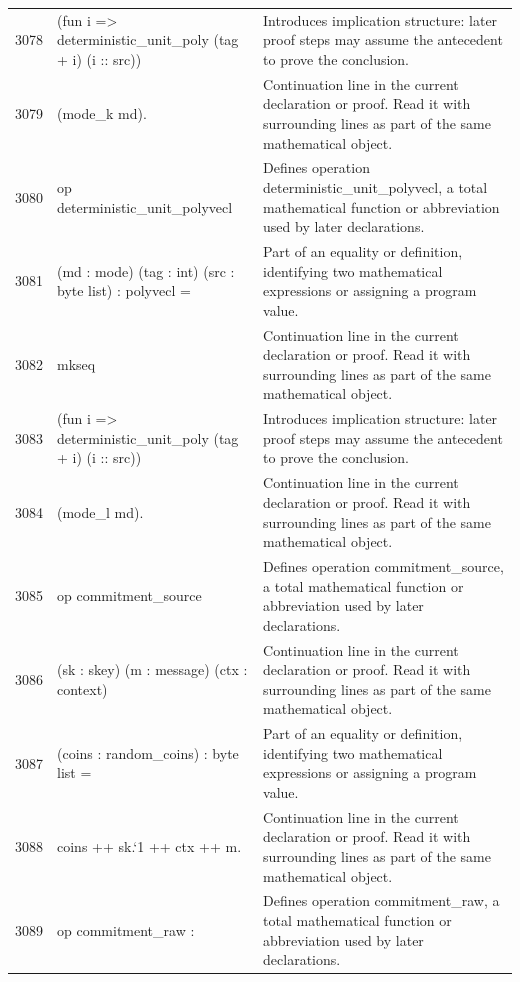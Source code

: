 \documentclass[10pt]{article}
\begin{document}
\begin{longtable}{r L{0.53\textwidth} L{0.37\textwidth}}
3078 & {\ttfamily\scriptsize     (fun i => deterministic\_unit\_poly (tag + i) (i :: src))} & Introduces implication structure: later proof steps may assume the antecedent to prove the conclusion. \\
3079 & {\ttfamily\scriptsize     (mode\_k md).} & Continuation line in the current declaration or proof.  Read it with surrounding lines as part of the same mathematical object. \\
3080 & {\ttfamily\scriptsize op deterministic\_unit\_polyvecl} & Defines operation deterministic\_unit\_polyvecl, a total mathematical function or abbreviation used by later declarations. \\
3081 & {\ttfamily\scriptsize    (md : mode) (tag : int) (src : byte list) : polyvecl =} & Part of an equality or definition, identifying two mathematical expressions or assigning a program value. \\
3082 & {\ttfamily\scriptsize   mkseq} & Continuation line in the current declaration or proof.  Read it with surrounding lines as part of the same mathematical object. \\
3083 & {\ttfamily\scriptsize     (fun i => deterministic\_unit\_poly (tag + i) (i :: src))} & Introduces implication structure: later proof steps may assume the antecedent to prove the conclusion. \\
3084 & {\ttfamily\scriptsize     (mode\_l md).} & Continuation line in the current declaration or proof.  Read it with surrounding lines as part of the same mathematical object. \\
3085 & {\ttfamily\scriptsize op commitment\_source} & Defines operation commitment\_source, a total mathematical function or abbreviation used by later declarations. \\
3086 & {\ttfamily\scriptsize    (sk : skey) (m : message) (ctx : context)} & Continuation line in the current declaration or proof.  Read it with surrounding lines as part of the same mathematical object. \\
3087 & {\ttfamily\scriptsize    (coins : random\_coins) : byte list =} & Part of an equality or definition, identifying two mathematical expressions or assigning a program value. \\
3088 & {\ttfamily\scriptsize   coins ++ sk.`1 ++ ctx ++ m.} & Continuation line in the current declaration or proof.  Read it with surrounding lines as part of the same mathematical object. \\
3089 & {\ttfamily\scriptsize op commitment\_raw :} & Defines operation commitment\_raw, a total mathematical function or abbreviation used by later declarations. \\

\end{longtable}
\end{document}
